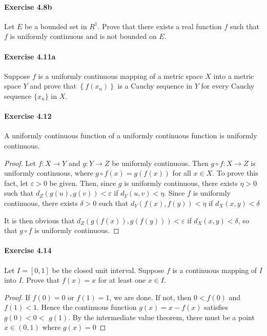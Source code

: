 \documentclass{article}
\theoremstyle{definition}
\begin{document}
\paragraph{Exercise 4.8b} Let $E$ be a bounded set in $R^{1}$. Prove that there exists a real function $f$ such that $f$ is uniformly continuous and is not bounded on $E$.


\paragraph{Exercise 4.11a} Suppose $f$ is a uniformly continuous mapping of a metric space $X$ into a metric space $Y$ and prove that $\left\{f\left(x_{n}\right)\right\}$ is a Cauchy sequence in $Y$ for every Cauchy sequence $\{x_n\}$ in $X$.


\paragraph{Exercise 4.12} A uniformly continuous function of a uniformly continuous function is uniformly continuous.
\begin{proof}
    Let $f: X \rightarrow Y$ and $g: Y \rightarrow Z$ be uniformly continuous. Then $g \circ f: X \rightarrow Z$ is uniformly continuous, where $g \circ f(x)=g(f(x))$ for all $x \in X$.
To prove this fact, let $\varepsilon>0$ be given. Then, since $g$ is uniformly continuous, there exists $\eta>0$ such that $d_Z(g(u), g(v))<\varepsilon$ if $d_Y(u, v)<\eta$. Since $f$ is uniformly continuous, there exists $\delta>0$ such that $d_Y(f(x), f(y))<\eta$ if $d_X(x, y)<\delta$

It is then obvious that $d_Z(g(f(x)), g(f(y)))<\varepsilon$ if $d_X(x, y)<\delta$, so that $g \circ f$ is uniformly continuous.
\end{proof}



\paragraph{Exercise 4.14} Let $I=[0,1]$ be the closed unit interval. Suppose $f$ is a continuous mapping of $I$ into $I$. Prove that $f(x)=x$ for at least one $x \in I$.
\begin{proof}
    If $f(0)=0$ or $f(1)=1$, we are done. If not, then $0<f(0)$ and $f(1)<1$. Hence the continuous function $g(x)=x-f(x)$ satisfies $g(0)<0<$ $g(1)$. By the intermediate value theorem, there must be a point $x \in(0,1)$ where $g(x)=0$
\end{proof}
\end{document}

